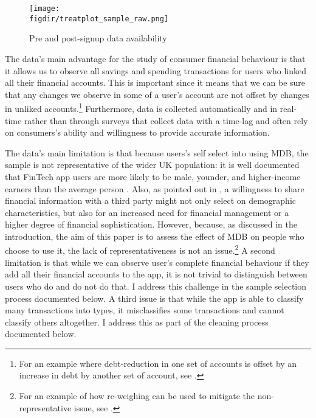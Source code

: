 \begin{figure}[h]
\centering
\caption{Pre and post-signup data availability}%
\texttt{[image: \\figdir/treatplot\_sample\_raw.png]}
\label{fig:treatplot}
\end{figure}

The data's main advantage for the study of consumer financial behaviour is that
it allows us to observe all savings and spending transactions for users who
linked all their financial accounts. This is important since it means that we
can be sure that any changes we observe in some of a user's account are not
offset by changes in unliked accounts.\footnote{For an example where debt-reduction in
one set of accounts is offset by an increase in debt by another set of account,
see \citet{medina2021side}.} Furthermore, data is collected automatically and
in real-time rather than through surveys that collect data with a time-lag and
often rely on consumers's ability and willingness to provide accurate
information.

The data's main limitation is that because users's self select into using MDB,
the sample is not representative of the wider UK population: it is well
documented that FinTech app users are more likely to be male, younder, and
higher-income earners than the average person \citet{carlin2019generational}.
Also, as pointed out in \citet{gelman2014harnessing}, a willingness to share
financial information with a third party might not only select on demographic
characteristics, but also for an increased need for financial management or a
higher degree of financial sophistication. However, because, as discussed in
the introduction, the aim of this paper is to assess the effect of MDB on
people who choose to use it, the lack of representativeness is not an
issue.\footnote{For an example of how re-weighing can be used to mitigate the
non-representative issue, see \citet{bourquin2020effects}.} A second limitation
is that while we can observe user's complete financial behaviour if they add
all their financial accounts to the app, it is not trivial to distinguish
between users who do and do not do that. I address this challenge in the sample
selection process documented below. A third issue is that while the app is able
to classify many transactions into types, it misclassifies some transactions
and cannot classify others altogether. I address this as part of the cleaning
process documented below.

